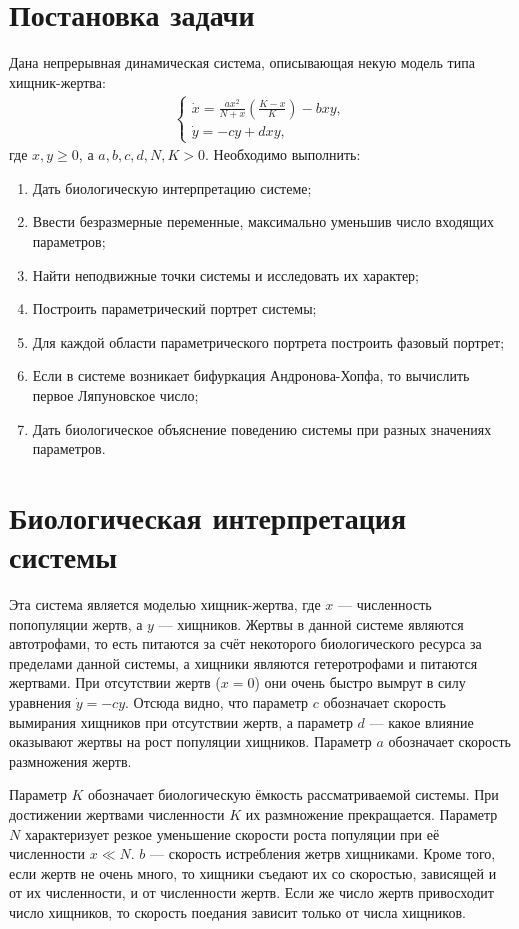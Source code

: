 \documentclass[11pt]{article}
\begin{document}
\section{Постановка задачи}
Дана непрерывная динамическая система, описывающая некую модель типа хищник-жертва:
\begin{gather}
\left\{ \begin{aligned}
\dot{x} = \frac{ax^2}{N + x}\left( \frac{K - x}{K} \right) - bxy, \\
\dot{y} = -cy + dxy,
\end{aligned} \right. %
\end{gather}
где $x, y \geqslant 0$, а $a, b, c, d, N, K > 0$. Необходимо выполнить:
\begin{enumerate}
\item
Дать биологическую интерпретацию системе;
\item
Ввести безразмерные переменные, максимально уменьшив число входящих параметров;
\item
Найти неподвижные точки системы и исследовать их характер;
\item
Построить параметрический портрет системы;
\item
Для каждой области параметрического портрета построить фазовый портрет;
\item
Если в системе возникает бифуркация Андронова-Хопфа, то вычислить первое Ляпуновское число;
\item
Дать биологическое объяснение поведению системы при разных значениях параметров.
\end{enumerate}

\section{Биологическая интерпретация системы}

Эта система является моделью хищник-жертва, где $x$ --- численность попопуляции жертв, а $y$ --- хищников. Жертвы в данной системе являются автотрофами, то есть питаются за счёт некоторого биологического ресурса за пределами данной системы, а хищники являются гетеротрофами и питаются жертвами. При отсутствии жертв ($x = 0$) они очень быстро вымрут в силу уравнения $\dot{y} = -cy$. Отсюда видно, что параметр $c$ обозначает скорость вымирания хищников при отсутствии жертв, а параметр $d$ --- какое влияние оказывают жертвы на рост популяции хищников. Параметр $a$ обозначает скорость размножения жертв.

Параметр $K$ обозначает биологическую ёмкость рассматриваемой системы. При достижении жертвами численности $K$ их размножение прекращается. Параметр $N$ характеризует резкое уменьшение скорости роста популяции при её численности $x \ll N$. $b$ --- скорость истребления жетрв хищниками. Кроме того, если жертв не очень много, то хищники съедают их со скоростью, зависящей и от их численности, и от численности жертв. Если же число жертв привосходит число хищников, то скорость поедания зависит только от числа хищников.
\end{document}

